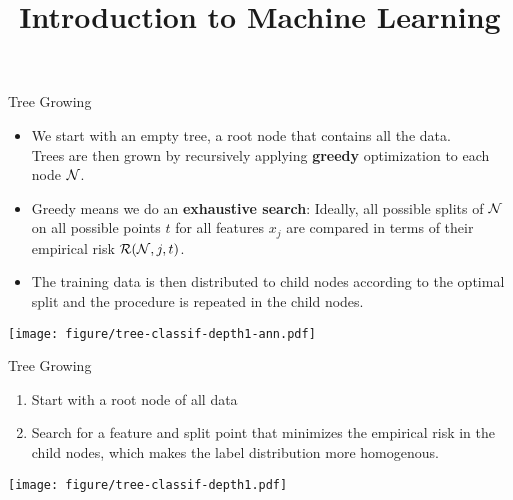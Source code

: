 \documentclass[11pt,compress,t,notes=noshow, xcolor=table]{beamer}
\title{Introduction to Machine Learning}
\institute{\href{https://compstat-lmu.github.io/lecture_i2ml/}{compstat-lmu.github.io/lecture\_i2ml}}
\date{}
\begin{document}
\sloppy

\begin{vbframe}{Tree Growing}

\begin{itemize}

\item We start with an empty tree, a root node that contains all the data.\\
Trees are then grown by recursively applying \textbf{greedy} optimization to each node $\mathcal{N}$.

\item Greedy means we do an \textbf{exhaustive search}: Ideally, all possible splits of $\mathcal{N}$ on all possible points $t$ for all features $x_j$ are compared in terms of their empirical risk $\mathcal{R}(\mathcal{N}, j, t)$. 

\item The training data is then distributed to child nodes according to the optimal split and the procedure is repeated in the child nodes.

\end{itemize}

\color{fgcolor}

{\centering \texttt{[image: figure/tree-classif-depth1-ann.pdf]} 

}

\end{vbframe}


\begin{vbframe}{Tree Growing}

\begin{enumerate}
\item Start with a root node of all data
\item Search for a feature and split point that minimizes the empirical risk in the child nodes, which makes the label distribution more homogenous.
\end{enumerate}

\color{fgcolor}

{\centering \texttt{[image: figure/tree-classif-depth1.pdf]} 

}

\end{vbframe}
\end{document}
